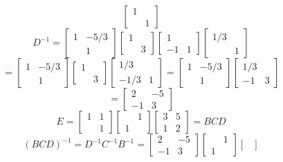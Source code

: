 \begin{description}
$$\begin{bmatrix}
1 & \\
& 1
\end{bmatrix}$$
$$D^{-1} = \begin{bmatrix}
1 & -5/3 \\
& 1
\end{bmatrix}\begin{bmatrix}
1 & \\
& 3
\end{bmatrix}\begin{bmatrix}
1 & \\
-1 & 1
\end{bmatrix}\begin{bmatrix}
1/3 & \\
& 1
\end{bmatrix}$$
$$= \begin{bmatrix}
1 & -5/3 \\
& 1
\end{bmatrix}\begin{bmatrix}
1 & \\
& 3
\end{bmatrix}\begin{bmatrix}
1/3 & \\
-1/3 & 1
\end{bmatrix} = \begin{bmatrix}
1 & -5/3 \\
& 1
\end{bmatrix}\begin{bmatrix}
1/3 & \\
-1 & 3
\end{bmatrix}$$
$$= \begin{bmatrix}
2 & -5 \\
-1 & 3
\end{bmatrix}$$
$$E = \begin{bmatrix}
1 & 1 \\
& 1
\end{bmatrix}\begin{bmatrix}
& 1 \\
1 &
\end{bmatrix}\begin{bmatrix}
3 & 5 \\
1 & 2
\end{bmatrix} = BCD$$
$$(BCD)^{-1} = D^{-1}C^{-1}B^{-1} = \begin{bmatrix}
2 & -5 \\
-1 & 3
\end{bmatrix}\begin{bmatrix}
& 1 \\
1 &
\end{bmatrix}\begin{bmatrix}

\end{bmatrix}$$
\end{description}
